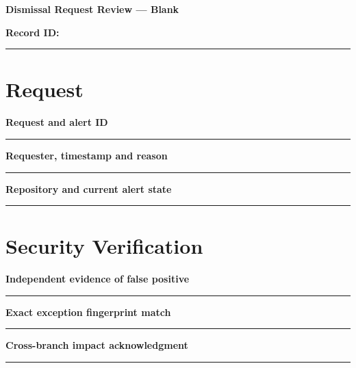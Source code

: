 \documentclass[11pt,letterpaper]{article}
\begin{document}
\begin{center}{\LARGE\bfseries Dismissal Request Review --- Blank}\par
\vspace{4pt}{\small Print-ready unfilled assessment instrument}\par
\end{center}
\noindent\textbf{Record ID:} \rule{2.6in}{0.4pt}\par
\section{Request}
\noindent\textbf{Request and alert ID}\par
\vspace{1.1em}\noindent\rule{0.96\linewidth}{0.4pt}\par\vspace{0.65em}
\noindent\textbf{Requester, timestamp and reason}\par
\vspace{1.1em}\noindent\rule{0.96\linewidth}{0.4pt}\par\vspace{0.65em}
\noindent\textbf{Repository and current alert state}\par
\vspace{1.1em}\noindent\rule{0.96\linewidth}{0.4pt}\par\vspace{0.65em}
\section{Security Verification}
\noindent\textbf{Independent evidence of false positive}\par
\vspace{1.1em}\noindent\rule{0.96\linewidth}{0.4pt}\par\vspace{0.65em}
\noindent\textbf{Exact exception fingerprint match}\par
\vspace{1.1em}\noindent\rule{0.96\linewidth}{0.4pt}\par\vspace{0.65em}
\noindent\textbf{Cross-branch impact acknowledgment}\par
\vspace{1.1em}\noindent\rule{0.96\linewidth}{0.4pt}\par\vspace{0.65em}
\end{document}
